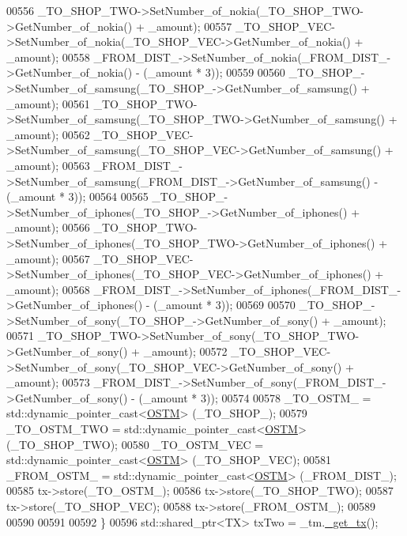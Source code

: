 \begin{DoxyCode}
00556                 \_TO\_SHOP\_TWO->SetNumber\_of\_nokia(\_TO\_SHOP\_TWO->GetNumber\_of\_nokia() + \_amount);
00557                 \_TO\_SHOP\_VEC->SetNumber\_of\_nokia(\_TO\_SHOP\_VEC->GetNumber\_of\_nokia() + \_amount);
00558                 \_FROM\_DIST\_->SetNumber\_of\_nokia(\_FROM\_DIST\_->GetNumber\_of\_nokia() - (\_amount * 3));
00559 
00560                 \_TO\_SHOP\_->SetNumber\_of\_samsung(\_TO\_SHOP\_->GetNumber\_of\_samsung() + \_amount);
00561                 \_TO\_SHOP\_TWO->SetNumber\_of\_samsung(\_TO\_SHOP\_TWO->GetNumber\_of\_samsung() + \_amount);
00562                 \_TO\_SHOP\_VEC->SetNumber\_of\_samsung(\_TO\_SHOP\_VEC->GetNumber\_of\_samsung() + \_amount);
00563                 \_FROM\_DIST\_->SetNumber\_of\_samsung(\_FROM\_DIST\_->GetNumber\_of\_samsung() - (\_amount * 3));
00564 
00565                 \_TO\_SHOP\_->SetNumber\_of\_iphones(\_TO\_SHOP\_->GetNumber\_of\_iphones() + \_amount);
00566                 \_TO\_SHOP\_TWO->SetNumber\_of\_iphones(\_TO\_SHOP\_TWO->GetNumber\_of\_iphones() + \_amount);
00567                 \_TO\_SHOP\_VEC->SetNumber\_of\_iphones(\_TO\_SHOP\_VEC->GetNumber\_of\_iphones() + \_amount);
00568                 \_FROM\_DIST\_->SetNumber\_of\_iphones(\_FROM\_DIST\_->GetNumber\_of\_iphones() - (\_amount * 3));
00569 
00570                 \_TO\_SHOP\_->SetNumber\_of\_sony(\_TO\_SHOP\_->GetNumber\_of\_sony() + \_amount);
00571                 \_TO\_SHOP\_TWO->SetNumber\_of\_sony(\_TO\_SHOP\_TWO->GetNumber\_of\_sony() + \_amount);
00572                 \_TO\_SHOP\_VEC->SetNumber\_of\_sony(\_TO\_SHOP\_VEC->GetNumber\_of\_sony() + \_amount);
00573                 \_FROM\_DIST\_->SetNumber\_of\_sony(\_FROM\_DIST\_->GetNumber\_of\_sony() - (\_amount * 3));
00574 
00578                 \_TO\_OSTM\_ = std::dynamic\_pointer\_cast<\hyperlink{class_o_s_t_m}{OSTM}> (\_TO\_SHOP\_);
00579                 \_TO\_OSTM\_TWO = std::dynamic\_pointer\_cast<\hyperlink{class_o_s_t_m}{OSTM}> (\_TO\_SHOP\_TWO);
00580                 \_TO\_OSTM\_VEC = std::dynamic\_pointer\_cast<\hyperlink{class_o_s_t_m}{OSTM}> (\_TO\_SHOP\_VEC);
00581                 \_FROM\_OSTM\_ = std::dynamic\_pointer\_cast<\hyperlink{class_o_s_t_m}{OSTM}> (\_FROM\_DIST\_);
00585                 tx->store(\_TO\_OSTM\_);
00586                 tx->store(\_TO\_SHOP\_TWO);
00587                 tx->store(\_TO\_SHOP\_VEC);
00588                 tx->store(\_FROM\_OSTM\_);
00589 
00590 
00591 
00592             \}
00596             std::shared\_ptr<TX> txTwo = \_tm.\hyperlink{class_t_m_a41cb0226cc4080c931651b13f74a0075_a41cb0226cc4080c931651b13f74a0075}{\_get\_tx}();

\end{DoxyCode}
